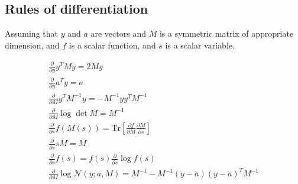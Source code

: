 \documentclass{paper}
\begin{document}
\subsection{Rules of differentiation}

Assuming that $y$ and $a$ are vectors and $M$ is a symmetric matrix of appropriate dimension, and $f$ is a scalar function, and $s$ is a scalar variable.

\begin{eqnarray}
\frac{\partial}{\partial y} y^T M y = 2 M y \label{eq:deriv_quadratic} \\
\frac{\partial}{\partial y} a^T y = a \label{eq:deriv_scalarprod} \\
\frac{\partial}{\partial M} y^T M^{-1} y = - M^{-1} yy^T M^{-1} \label{eq:deriv_quad_mat} \\
\frac{\partial}{\partial M} \log \det M = M^{-1} \label{eq:deriv_logdet} \\
\frac{\partial}{\partial s} f(M(s)) = \textrm{Tr} \left[ \frac{\partial f}{\partial M} \frac{\partial M}{\partial s} \right] \label{eq:deriv_chain} \\
\frac{\partial}{\partial s} s M = M \label{eq:deriv_scalar} \\
\frac{\partial}{\partial s} f(s) = f(s) \frac{\partial}{\partial s} \log f(s) \label{eq:deriv_function} \\
\frac{\partial}{\partial M} \log \mathcal{N}(y;a,M) = M^{-1} - M^{-1}(y-a)(y-a)^TM^{-1} \label{eq:deriv_gausscov}
\end{eqnarray}
\end{document}
